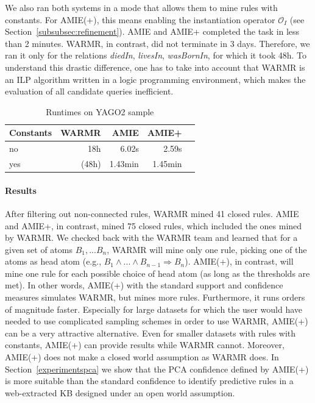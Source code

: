 We also ran both systems in a mode that allows them to mine rules with constants.
For AMIE(+), this means enabling the instantiation operator $\mathcal{O}_I$ (see Section~\ref{subsubsec:refinement}).
AMIE and AMIE+ completed the task in less than 2 minutes. WARMR, in contrast, did not terminate in 3 days.
Therefore, we ran it only for the relations \textit{diedIn}, \textit{livesIn}, \textit{wasBornIn}, for which it took 48h.
To understand this drastic difference, one has to take into account that WARMR is an ILP algorithm written in a logic programming environment,
which makes the evaluation of all candidate queries inefficient.

\begin{table}
\begin{tabular}{l|rr rr|}
Constants 	& WARMR 		& AMIE 		& AMIE+\\
\hline
 no 		& 18h 			& 6.02s 	& 2.59s \\
 yes 		& (48h) 	 	& 1.43min  	& 1.45min\\
\end{tabular}
\caption{Runtimes on YAGO2 sample}
\label{warmrruntime}
\end{table}


\paragraph{Results} After filtering out non-connected rules, WARMR mined 41 closed rules.
AMIE and AMIE+, in contrast, mined 75 closed rules, which included the ones mined by WARMR.
We checked back with the WARMR team and learned that for a given set of atoms $B_1, ... B_n$,
WARMR will mine only one rule,
picking one of the atoms as head atom (e.g., $B_1 \wedge ... \wedge B_{n-1} \Rightarrow B_n$).
AMIE(+), in contrast, will mine one rule for each possible choice of head atom (as long as the thresholds are met).
In other words, AMIE(+) with the standard support and confidence measures simulates WARMR, but mines more rules.
Furthermore, it runs orders of magnitude faster.
Especially for large datasets for which the user would have needed to use complicated sampling schemes in order to use WARMR,
AMIE(+) can be a very attractive alternative.
Even for smaller datasets with rules with constants, AMIE(+) can provide results while WARMR cannot.
Moreover, AMIE(+) does not make a closed world assumption as WARMR does.
In Section~\ref{experimentspca} we show that the PCA confidence defined by AMIE(+)
is more suitable than the standard confidence to identify predictive rules in a web-extracted KB designed under
an open world assumption.

